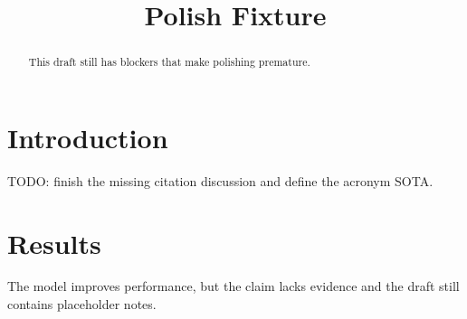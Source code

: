 \documentclass{article}
\title{Polish Fixture}
\begin{document}
\begin{abstract}
This draft still has blockers that make polishing premature.
\end{abstract}
\section{Introduction}
TODO: finish the missing citation discussion and define the acronym SOTA.
\section{Results}
The model improves performance, but the claim lacks evidence and the draft still contains placeholder notes.
\end{document}
